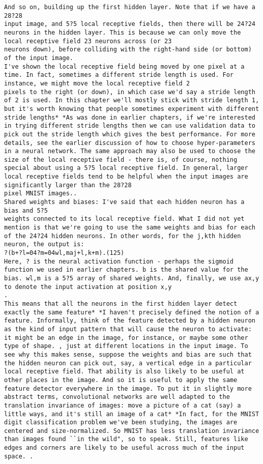 \begin{lstlisting}
And so on, building up the first hidden layer. Note that if we have a 28?28
input image, and 5?5 local receptive fields, then there will be 24?24 neurons in the hidden layer. This is because we can only move the local receptive field 23 neurons across (or 23
neurons down), before colliding with the right-hand side (or bottom) of the input image.
I've shown the local receptive field being moved by one pixel at a time. In fact, sometimes a different stride length is used. For instance, we might move the local receptive field 2
pixels to the right (or down), in which case we'd say a stride length of 2 is used. In this chapter we'll mostly stick with stride length 1, but it's worth knowing that people sometimes experiment with different stride lengths* *As was done in earlier chapters, if we're interested in trying different stride lengths then we can use validation data to pick out the stride length which gives the best performance. For more details, see the earlier discussion of how to choose hyper-parameters in a neural network. The same approach may also be used to choose the size of the local receptive field - there is, of course, nothing special about using a 5?5 local receptive field. In general, larger local receptive fields tend to be helpful when the input images are significantly larger than the 28?28
pixel MNIST images..
Shared weights and biases: I've said that each hidden neuron has a bias and 5?5
weights connected to its local receptive field. What I did not yet mention is that we're going to use the same weights and bias for each of the 24?24 hidden neurons. In other words, for the j,kth hidden neuron, the output is: 
?(b+?l=04?m=04wl,maj+l,k+m).(125)
Here, ? is the neural activation function - perhaps the sigmoid function we used in earlier chapters. b is the shared value for the bias. wl,m is a 5?5 array of shared weights. And, finally, we use ax,y to denote the input activation at position x,y
.
This means that all the neurons in the first hidden layer detect exactly the same feature* *I haven't precisely defined the notion of a feature. Informally, think of the feature detected by a hidden neuron as the kind of input pattern that will cause the neuron to activate: it might be an edge in the image, for instance, or maybe some other type of shape. , just at different locations in the input image. To see why this makes sense, suppose the weights and bias are such that the hidden neuron can pick out, say, a vertical edge in a particular local receptive field. That ability is also likely to be useful at other places in the image. And so it is useful to apply the same feature detector everywhere in the image. To put it in slightly more abstract terms, convolutional networks are well adapted to the translation invariance of images: move a picture of a cat (say) a little ways, and it's still an image of a cat* *In fact, for the MNIST digit classification problem we've been studying, the images are centered and size-normalized. So MNIST has less translation invariance than images found ``in the wild", so to speak. Still, features like edges and corners are likely to be useful across much of the input space. .

\end{lstlisting}
